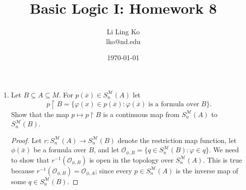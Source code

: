 \documentclass{article}
\begin{document}
\title{Basic Logic I: Homework 8}
\author{Li Ling Ko\\ lko@nd.edu}
\date{\today}
\maketitle

\begin{enumerate}[label={\bf Q\arabic*:}]
  \item Let $B\subseteq A\subseteq M$. For $p(\overline{x})\in
    S^{\mathcal{M}}_n(A)$ let \[p\restriction B=\{\varphi(x)\in
    p(\overline{x}):\varphi(\overline{x})\; \text{is a formula over}\;
    B\}.\] Show that the map $p\mapsto p\restriction B$ is a continuous
    map from $S^{\mathcal{M}}_n(A)$ to $S^{\mathcal{M}}_n(B)$.

    \begin{proof}
      Let $r:S^{\mathcal{M}}_n(A)\rightarrow S^{\mathcal{M}}_n(B)$ denote
      the restriction map function, let $\phi(\bar{x})$ be a formula over
      $B$, and let $\mathcal{O}_{\phi,B}=\{q\in
      S^{\mathcal{M}}_n(B):\varphi\in q\}$. We need to show that
      $r^{-1}(\mathcal{O}_{\phi,B})$ is open in the topology over
      $S^{\mathcal{M}}_n(A)$. This is true because
      $r^{-1}(\mathcal{O}_{\phi,B})=\mathcal{O}_{\phi,A}$; since every
      $p\in S^{\mathcal{M}}_n(A)$ is the inverse map of some $q\in
      S^{\mathcal{M}}_n(B)$.
    \end{proof}
\end{enumerate}
\end{document}
